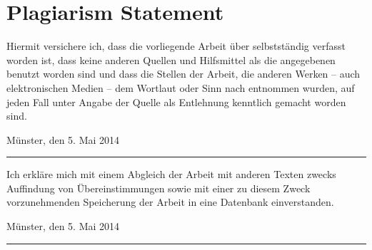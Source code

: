 \chapter*{Plagiarism Statement}
Hiermit versichere ich, dass die vorliegende Arbeit über \emph{\MyTitle} selbstständig verfasst worden ist, dass keine anderen Quellen und Hilfsmittel als die angegebenen benutzt worden sind und dass die Stellen der Arbeit, die anderen Werken – auch elektronischen Medien – dem Wortlaut oder Sinn nach entnommen wurden, auf jeden Fall unter Angabe der Quelle als Entlehnung kenntlich gemacht worden sind.
\begin{flushright}
	Münster, den 5. Mai 2014\hspace{.6cm}\rule{6cm}{.5pt}
\end{flushright}
\vspace{1cm}

Ich erkläre mich mit einem Abgleich der Arbeit mit anderen Texten zwecks Auffindung von Übereinstimmungen sowie mit einer zu diesem Zweck vorzunehmenden Speicherung der Arbeit in eine Datenbank einverstanden.

\begin{flushright}
	Münster, den 5. Mai 2014\hspace{.6cm}\rule{6cm}{.5pt}
\end{flushright}
